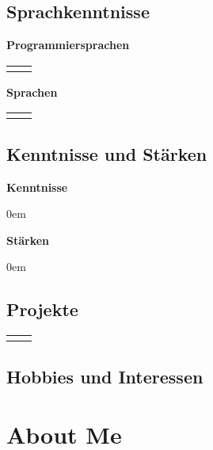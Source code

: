 \documentclass[
	a4paper,
	fontsize=12
]{scrartcl}
\begin{document}
\subsection{Sprachkenntnisse}
\begin{minipage}[t]{0.5\textwidth}
	\textbf{Programmiersprachen}\\\medskip
	\begin{tabularx}{\textwidth}{l!{\color{RoyalBlue}\vrule}X}
		\CVProgLangs
	\end{tabularx}
\end{minipage}
\begin{minipage}[t]{0.5\textwidth}
	\textbf{Sprachen}\\\medskip
	\begin{tabularx}{\textwidth}{l!{\color{RoyalBlue}\vrule}X}
		\CVNatLangs
	\end{tabularx}
\end{minipage}

\subsection{Kenntnisse und Stärken}
\begin{minipage}[t]{0.5\textwidth}
	\textbf{Kenntnisse}	
	\begin{itemize}\itemsep0em
		\CVKnowledge
	\end{itemize}
\end{minipage}
\begin{minipage}[t]{0.5\textwidth}
	\textbf{Stärken}
	\begin{itemize}\itemsep0em 
		\CVStrength
	\end{itemize}
\end{minipage}

\filbreak
\subsection{Projekte}
	\begin{tabularx}{\textwidth}{l!{\color{RoyalBlue}\vrule}X}
		\CVProjects
	\end{tabularx}

\subsection{Hobbies und Interessen}
	\CVHobbiesInterests
\newpage

\endgroup %

\section{About Me}
\RecpSalutation
\bigskip
\end{document}
